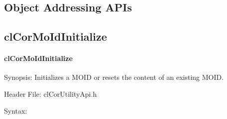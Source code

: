 \begin{flushleft}
\section{Object Addressing APIs}
\subsection{clCorMoIdInitialize}
\hypertarget{pagecor112}{}\paragraph{cl\-Cor\-MoId\-Initialize}\label{pagecor112}
\begin{Desc}
\item[Synopsis:]Initializes a MOID or resets the content of an existing MOID. \end{Desc}
\begin{Desc}
\item[Header File:]clCorUtilityApi.h\end{Desc}
\begin{Desc}
\item[Syntax:]


\end{Desc}
\end{flushleft}
